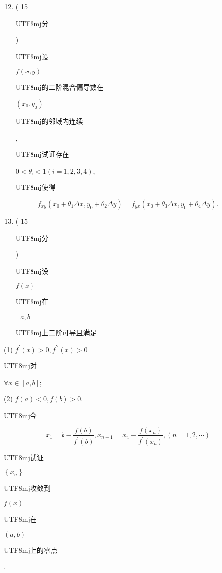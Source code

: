 \documentclass[10pt]{article}
\begin{document}
\begin{enumerate}
  \setcounter{enumi}{11}
  \item ( 15 \begin{CJK}{UTF8}{mj}分\end{CJK}) \begin{CJK}{UTF8}{mj}设\end{CJK} $f(x, y)$ \begin{CJK}{UTF8}{mj}的二阶混合偏导数在\end{CJK} $\left(x_{0}, y_{0}\right)$ \begin{CJK}{UTF8}{mj}的邻域内连续\end{CJK}, \begin{CJK}{UTF8}{mj}试证存在\end{CJK} $0<\theta_{i}<1(i=1,2,3,4)$, \begin{CJK}{UTF8}{mj}使得\end{CJK}
\end{enumerate}
$$
f_{x y}\left(x_{0}+\theta_{1} \Delta x, y_{0}+\theta_{2} \Delta y\right)=f_{y x}\left(x_{0}+\theta_{3} \Delta x, y_{0}+\theta_{4} \Delta y\right) .
$$

\begin{enumerate}
  \setcounter{enumi}{12}
  \item ( 15 \begin{CJK}{UTF8}{mj}分\end{CJK}) \begin{CJK}{UTF8}{mj}设\end{CJK} $f(x)$ \begin{CJK}{UTF8}{mj}在\end{CJK} $[a, b]$ \begin{CJK}{UTF8}{mj}上二阶可导且满足\end{CJK}
\end{enumerate}
(1) $f^{\prime}(x)>0, f^{\prime \prime}(x)>0$ \begin{CJK}{UTF8}{mj}对\end{CJK} $\forall x \in[a, b]$;

(2) $f(a)<0, f(b)>0$.

\begin{CJK}{UTF8}{mj}今\end{CJK}
$$
x_{1}=b-\frac{f(b)}{f^{\prime}(b)}, x_{n+1}=x_{n}-\frac{f\left(x_{n}\right)}{f^{\prime}\left(x_{n}\right)},(n=1,2, \cdots)
$$
\begin{CJK}{UTF8}{mj}试证\end{CJK} $\left\{x_{n}\right\}$ \begin{CJK}{UTF8}{mj}收敛到\end{CJK} $f(x)$ \begin{CJK}{UTF8}{mj}在\end{CJK} $(a, b)$ \begin{CJK}{UTF8}{mj}上的零点\end{CJK}.
\end{document}
